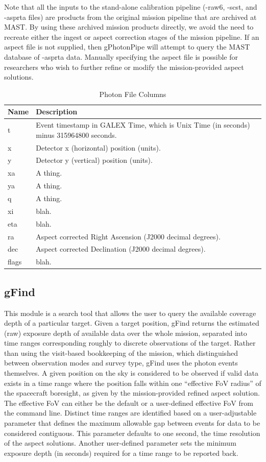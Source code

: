 \documentclass[5p]{elsarticle}
\begin{document}
Note that all the inputs to the stand-alone calibration pipeline (-raw6, -scst, and -asprta files) are products from the original mission pipeline that are archived at MAST.  By using these archived mission products directly, we avoid the need to recreate either the ingest or aspect correction stages of the mission pipeline. If an aspect file is not supplied, then gPhotonPipe will attempt to query the MAST database of -asprta data.  Manually specifying the aspect file is possible for researchers who wish to further refine or modify the mission-provided aspect solutions.

\begin{table}
\begin{tabular}{|p{2cm}|p{6cm}|}
\hline
	{\bf Name} & {\bf Description}\\\hline
	t & Event timestamp in GALEX Time, which is Unix Time (in seconds) minus 315964800 seconds.\\\hline
	x & Detector x (horizontal) position (units).\\\hline
	y & Detector y (vertical) position (units).\\\hline
	xa & A thing.\\\hline
	ya & A thing.\\\hline
	q & A thing.\\\hline
	xi & blah.\\\hline
	eta & blah.\\\hline
	ra & Aspect corrected Right Ascension (J2000 decimal degrees).\\\hline
	dec & Aspect corrected Declination (J2000 decimal degrees).\\\hline
	flags & blah.\\
\hline
\end{tabular}
\caption{Photon File Columns}
\label{moduledesc}
\end{table}

\subsection{gFind}
This module is a search tool that allows the user to query the available coverage depth of a particular target. Given a target position, gFind returns the estimated (raw) exposure depth of available data over the whole mission, separated into time ranges corresponding roughly to discrete observations of the target. Rather than using the visit-based bookkeeping of the mission, which distinguished between observation modes and survey type, gFind uses the photon events themselves. A given position on the sky is considered to be observed if valid data exists in a time range where the position falls within one ``effective FoV radius'' of the spacecraft boresight, as given by the mission-provided refined aspect solution.  The effective FoV can either be the default or a user-defined effective FoV from the command line.  Distinct time ranges are identified based on a user-adjustable parameter that defines the maximum allowable gap between events for data to be considered contiguous.  This parameter defaults to one second, the time resolution of the aspect solutions. Another user-defined parameter sets the minimum exposure depth (in seconds) required for a time range to be reported back.
\end{document}
